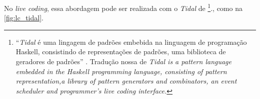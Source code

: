 No \emph{live coding}, essa abordagem pode ser realizada com o \emph{Tidal} de \footnote{``\emph{Tidal} é uma lingagem de padrões embebida na linguagem de programação Haskell, consistindo de representações de padrões, uma biblioteca de geradores de padrões'' \cite[p.~2]{mclean_tidal_2010}. Tradução nossa de \emph{Tidal is a pattern language embedded in the Haskell programming language, consisting of pattern representation,a library of pattern generators and combinators, an event scheduler and programmer’s live coding interface.}}., como na \autoref{fig:lc_tidal}. %

